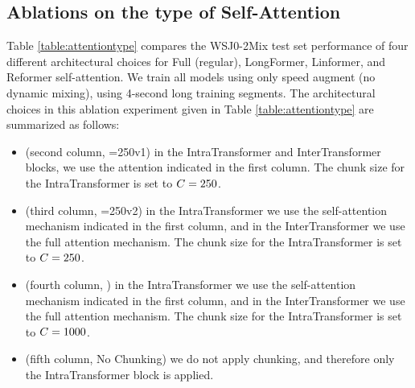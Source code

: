 \documentclass[lettersize,journal]{IEEEtran}
\begin{document}
\subsection{Ablations on the type of Self-Attention}


\begin{table*}[t!]
 \caption{Comparison of different types of self-attention (WSJ0-2Mix, test set). }
 \vspace{0.1cm}
 \label{table:attentiontype}
 \centering
{}
\end{table*}


Table \ref{table:attentiontype} compares the WSJ0-2Mix test set performance of four different architectural choices for Full (regular), LongFormer, Linformer, and Reformer self-attention. We train all models using only speed augment (no dynamic mixing), using 4-second long training segments. The architectural choices in this ablation experiment given in Table \ref{table:attentiontype} are summarized as follows:

\begin{itemize}
    \item (second column, \chnksize=250v1) in the IntraTransformer and InterTransformer blocks, we use the attention indicated in the first column. The chunk size for the IntraTransformer is set to $C=250$. 
    \item (third column, \chnksize=250v2) in the IntraTransformer we use the self-attention mechanism indicated in the first column, and in the InterTransformer we use the full attention mechanism. The chunk size for the IntraTransformer is set to $C=250$. 
    \item (fourth column, ) in the IntraTransformer we use the self-attention mechanism indicated in the first column, and in the InterTransformer we use the full attention mechanism. The chunk size for the IntraTransformer is set to $C=1000$.  
    \item (fifth column, No Chunking) we do not apply chunking, and therefore only the IntraTransformer block is applied. 
\end{itemize}
\end{document}
